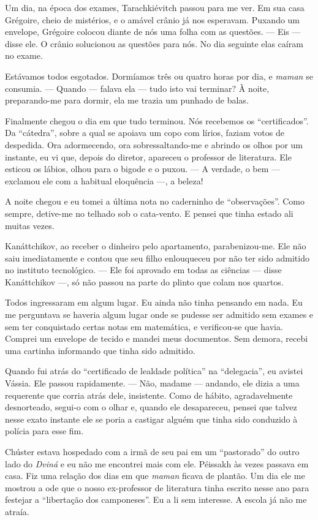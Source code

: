 Um dia, na época dos exames, Tarachkiévitch passou para me ver. Em sua
casa Grégoire, cheio de mistérios, e o amável crânio já nos esperavam.
Puxando um envelope, Grégoire colocou diante de nós uma folha com as
questões. --- Eis --- disse ele. O crânio solucionou as questões para
nós. No dia seguinte elas caíram no exame.

Estávamos todos esgotados. Dormíamos três ou quatro horas por dia, e
\emph{maman} se consumia. --- Quando --- falava ela --- tudo isto vai
terminar? À noite, preparando-me para dormir, ela me trazia um punhado
de balas.

Finalmente chegou o dia em que tudo terminou. Nós recebemos os
``certificados''. Da ``cátedra'', sobre a qual se apoiava um copo com
lírios, faziam votos de despedida. Ora adormecendo, ora
sobressaltando-me e abrindo os olhos por um instante, eu vi que, depois
do diretor, apareceu o professor de literatura. Ele esticou os lábios,
olhou para o bigode e o puxou. --- A verdade, o bem --- exclamou ele com
a habitual eloquência ---, a beleza!

A noite chegou e eu tomei a última nota no caderninho de
``observações''. Como sempre, detive-me no telhado sob o cata-vento. E
pensei que tinha estado ali muitas vezes.

Kanáttchikov, ao receber o dinheiro pelo apartamento, parabenizou-me.
Ele não saiu imediatamente e contou que seu filho enlouqueceu por não
ter sido admitido no instituto tecnológico. --- Ele foi aprovado em
todas as ciências --- disse Kanáttchikov ---, só não passou na parte do
plinto que colam nos quartos.

Todos ingressaram em algum lugar. Eu ainda não tinha pensando em nada.
Eu me perguntava se haveria algum lugar onde se pudesse ser admitido sem
exames e sem ter conquistado certas notas em matemática, e verificou-se
que havia. Comprei um envelope de tecido e mandei meus documentos. Sem
demora, recebi uma cartinha informando que tinha sido admitido.

Quando fui atrás do ``certificado de lealdade política'' na
``delegacia'', eu avistei Vássia. Ele passou rapidamente. --- Não,
madame --- andando, ele dizia a uma requerente que corria atrás dele,
insistente. Como de hábito, agradavelmente desnorteado, segui-o com o
olhar e, quando ele desapareceu, pensei que talvez nesse exato instante
ele se poria a castigar alguém que tinha sido conduzido à polícia para
esse fim.

Chúster estava hospedado com a irmã de seu pai em um ``pastorado'' do
outro lado do \emph{Dviná} e eu não me encontrei mais com ele. Péissakh
às vezes passava em casa. Fiz uma relação dos dias em que \emph{maman}
ficava de plantão. Um dia ele me mostrou a ode que o nosso ex-professor
de literatura tinha escrito nesse ano para festejar a ``libertação dos
camponeses''. Eu a li sem interesse. A escola já não me atraía.

